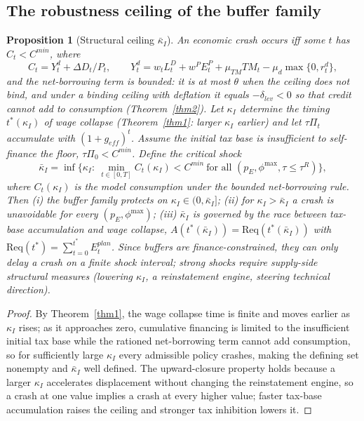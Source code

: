 \documentclass[review,12pt]{elsarticle}
\theoremstyle{plain}
\newtheorem{proposition}[theorem]{Proposition}
\theoremstyle{definition}
\theoremstyle{remark}
\begin{document}
\subsection{The robustness ceiling of the buffer family}
\begin{proposition}[Structural ceiling $\bar\kappa_I$]
\label{prop6}
An economic crash occurs iff some $t$ has $C_t<C^{min}$, where
\[
C_t=Y_t^d+\Delta D_t/P_t,\qquad
Y_t^d=w_tL_t^D+w^P E_t^P+\mu_{TM}TM_t-\mu_d\max\{0,r_t^d\},
\]
and the net-borrowing term is bounded: it is at most $\theta$ when the ceiling does not bind, and under a binding ceiling with deflation it equals $-\delta_{lev}<0$ so that credit cannot add to consumption (Theorem~\ref{thm2}).
Let $\kappa_I$ determine the timing $t^*(\kappa_I)$ of wage collapse (Theorem~\ref{thm1}: larger $\kappa_I$ earlier) and let $\tau\Pi_t$ accumulate with $(1+g_{eff})^t$. Assume the initial tax base is insufficient to self-finance the floor, $\tau\Pi_0<C^{min}$. Define the critical shock
\[
\bar\kappa_I=\inf\Big\{\kappa_I:\ \min_{t\in[0,T]} C_t(\kappa_I)<C^{min}\ \text{for all }(p_E,\phi^{\max},\tau\le\tau^R)\Big\},
\]
where $C_t(\kappa_I)$ is the model consumption under the bounded net-borrowing rule. Then (i) the buffer family protects on $\kappa_I\in(0,\bar\kappa_I]$; (ii) for $\kappa_I>\bar\kappa_I$ a crash is unavoidable for \emph{every} $(p_E,\phi^{\max})$; (iii) $\bar\kappa_I$ is governed by the race between tax-base accumulation and wage collapse, $A(t^*(\bar\kappa_I))=\mathrm{Req}(t^*(\bar\kappa_I))$ with $\mathrm{Req}(t^*)=\sum_{t=0}^{t^*}E_t^{plan}$. Since buffers are finance-constrained, they can only delay a crash on a finite shock interval; strong shocks require supply-side structural measures (lowering $\kappa_I$, a reinstatement engine, steering technical direction).
\end{proposition}
\begin{proof}
By Theorem~\ref{thm1}, the wage collapse time is finite and moves earlier as $\kappa_I$ rises; as it approaches zero, cumulative financing is limited to the insufficient initial tax base while the rationed net-borrowing term cannot add consumption, so for sufficiently large $\kappa_I$ every admissible policy crashes, making the defining set nonempty and $\bar\kappa_I$ well defined. The upward-closure property holds because a larger $\kappa_I$ accelerates displacement without changing the reinstatement engine, so a crash at one value implies a crash at every higher value; faster tax-base accumulation raises the ceiling and stronger tax inhibition lowers it.
\end{proof}
\end{document}
